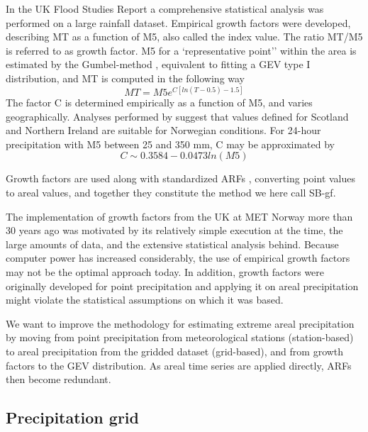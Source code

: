 \documentclass[12pt,a4paper,english]{article}
\begin{document}
In the UK Flood Studies Report \citep{NERC1975} a comprehensive statistical analysis was performed on a large rainfall dataset. Empirical growth factors were developed, describing MT as a function of M5, also called the index value. The ratio MT/M5 is referred to as growth factor. M5 for a `representative point'' within the area is estimated by the Gumbel-method \citep{Gumbel2004}, equivalent to fitting a GEV type I distribution, and MT is computed in the following way
\begin{equation}
MT=M5 e^{C[ln(T-0.5)-1.5]}
\end{equation}
The factor C is determined empirically as a function of M5, and varies geographically. Analyses performed by \cite{Forland1987} suggest that values defined for Scotland and Northern Ireland are suitable for Norwegian conditions. For 24-hour precipitation with M5 between 25 and 350 mm, C may be approximated by
\begin{equation}
C \sim0.3584 - 0.0473 ln(M5)
\end{equation}

\noindent Growth factors are used along with standardized ARFs \citep{NERC1975,Bell1976}, converting point values to areal values, and together they constitute the method we here call SB-gf. 

The implementation of growth factors from the UK \citep{NERC1975} at MET Norway more than 30 years ago was motivated by its relatively simple execution at the time, the large amounts of data, and the extensive statistical analysis behind. Because computer power has increased considerably, the use of empirical growth factors may not be the optimal approach today. In addition, growth factors were originally developed for point precipitation and applying it on areal precipitation might violate the statistical assumptions on which it was based.

We want to improve the methodology for estimating extreme areal precipitation by moving from point precipitation from meteorological stations (station-based) to areal precipitation from the gridded dataset (grid-based), and from growth factors to the GEV distribution. As areal time series are applied directly, ARFs then become redundant.

\subsection{Precipitation grid}
\end{document}
